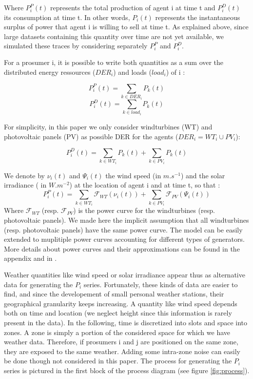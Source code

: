 \documentclass[conference]{IEEEtran}
\begin{document}
Where $ P_{i}^{P}(t) $ represents the total production of agent i at time t and $ P_{i}^{D}(t) $ its consumption at time t. In other words, $ P_{i}(t) $ represents the instantaneous surplus of power that agent i is willing to sell at time t. As explained above, since large datasets containing this quantity over time are not yet available, we simulated these traces by considering separately $ P_{i}^{P} $ and $ P_{i}^{D} $.

For a prosumer i, it is possible to write both quantities as a sum over the distributed energy ressources ($ DER_{i} $) and loads ($ load_{i} $) of i : 

\begin{equation}
P_{i}^{P}(t) = \sum_{k \in DER_{i}} P_{k}(t)
\end{equation}
\begin{equation}
P_{i}^{D}(t) = \sum_{k \in load_{i}} P_{k}(t)
\end{equation}

For simplicity, in this paper we only consider windturbines (WT) and photovoltaic panels (PV) as possible DER for the agents ($ DER_{i} = WT_{i} \cup PV_{i} $):  

\begin{equation}
P_{i}^{D}(t) = \sum_{k \in WT_{i}} P_{k}(t) + \sum_{k \in PV_{i}} P_{k}(t)
\end{equation} 

We denote by $ \nu_{i}(t) $ and $ \Psi_{i}(t) $ the wind speed (in $ m.s^{-1} $) and the solar irradiance ( in $ W.m^{-2} $) at the location of agent i and at time t, so that :
\begin{equation}
 P_{i}^{P}(t) = \sum_{k \in WT_{i}} \mathcal{F}_{WT}( \nu_{i}(t) ) + \sum_{k \in PV_{i} } \mathcal{F}_{PV}(\Psi_{i}(t) ) 
\end{equation}
Where $ \mathcal{F}_{WT} $ (resp. $ \mathcal{F}_{PV} $) is the power curve for the windturbines (resp. photovoltaic panels). We made here the implicit assumption that all windturbines (resp. photovoltaic panels) have the same power curve. The model can be easily extended to muplitiple power curves accounting for different types of generators. More details about power curves and their approximations can be found in the appendix and in \cite{Lydia2014}. 

Weather quantities like wind speed or solar irradiance appear thus as alternative data for generating the $ P_{i} $ series. Fortunately, these kinds of data are easier to find, and since the developement of small personal weather stations, their geographical granularity keeps increasing.  A quantity like wind speed depends both on time and location (we neglect height since this information is rarely present in the data). In the following, time is discretized into slots and space into zones. A zone is simply a portion of the considered space for which we have weather data. Therefore, if prosumers i and j are positioned on the same zone, they are exposed to the same weather. Adding some intra-zone noise can easily be done though not considered in this paper. The process for generating the $ P_{i} $ series is pictured in the first block of the process diagram (see figure \ref{fig:process}).
\end{document}
